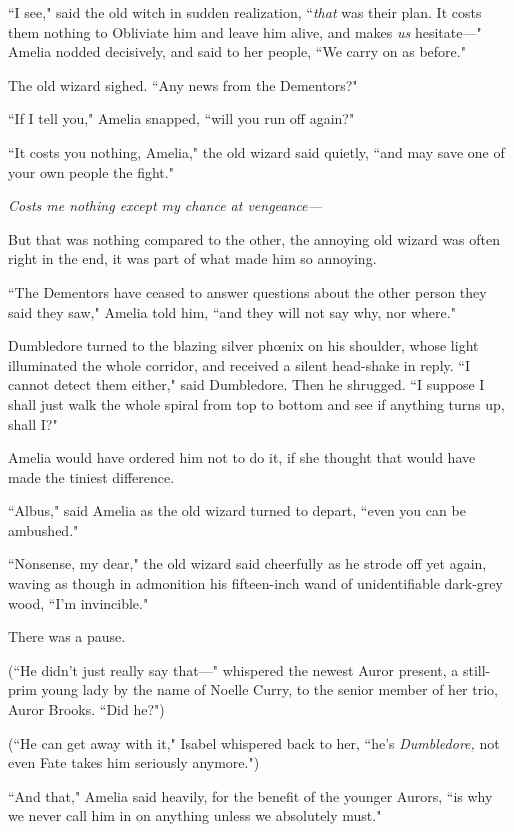 ``I see," said the old witch in sudden realization, ``\emph{that} was their plan. It costs them nothing to Obliviate him and leave him alive, and makes \emph{us} hesitate---" Amelia nodded decisively, and said to her people, ``We carry on as before."

The old wizard sighed. ``Any news from the Dementors?"

``If I tell you," Amelia snapped, ``will you run off again?"

``It costs you nothing, Amelia," the old wizard said quietly, ``and may save one of your own people the fight."

\emph{Costs me nothing except my chance at vengeance---}

But that was nothing compared to the other, the annoying old wizard was often right in the end, it was part of what made him so annoying.

``The Dementors have ceased to answer questions about the other person they said they saw," Amelia told him, ``and they will not say why, nor where."

Dumbledore turned to the blazing silver phœnix on his shoulder, whose light illuminated the whole corridor, and received a silent head-shake in reply. ``I cannot detect them either," said Dumbledore. Then he shrugged. ``I suppose I shall just walk the whole spiral from top to bottom and see if anything turns up, shall I?"

Amelia would have ordered him not to do it, if she thought that would have made the tiniest difference.

``Albus," said Amelia as the old wizard turned to depart, ``even you can be ambushed."

``Nonsense, my dear," the old wizard said cheerfully as he strode off yet again, waving as though in admonition his fifteen-inch wand of unidentifiable dark-grey wood, ``I'm invincible."

There was a pause.

(``He didn't just really say that---" whispered the newest Auror present, a still-prim young lady by the name of Noelle Curry, to the senior member of her trio, Auror Brooks. ``Did he?")

(``He can get away with it," Isabel whispered back to her, ``he's \emph{Dumbledore,} not even Fate takes him seriously anymore.")

``And that," Amelia said heavily, for the benefit of the younger Aurors, ``is why we never call him in on anything unless we absolutely must."


